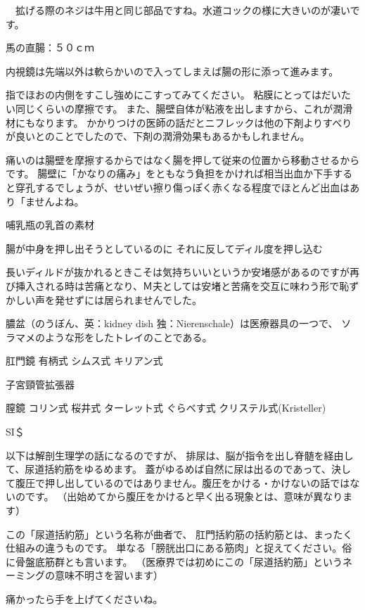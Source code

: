 　拡げる際のネジは牛用と同じ部品ですね。水道コックの様に大きいのが凄いです。

馬の直腸：５０ｃｍ


内視鏡は先端以外は軟らかいので入ってしまえば腸の形に添って進みます。

指でほおの内側をすこし強めにこすってみてください。
粘膜にとってはだいたい同じくらいの摩擦です。
また、腸壁自体が粘液を出しますから、これが潤滑材にもなります。
かかりつけの医師の話だとニフレックは他の下剤よりすべりが良いとのことでしたので、下剤の潤滑効果もあるかもしれません。

痛いのは腸壁を摩擦するからではなく腸を押して従来の位置から移動させるからです。
腸壁に「かなりの痛み」をともなう負担をかければ相当出血か下手すると穿孔するでしょうが、せいぜい擦り傷っぽく赤くなる程度でほとんど出血はあり「ませんよね。


哺乳瓶の乳首の素材


腸が中身を押し出そうとしているのに
それに反してディル度を押し込む

長いディルドが抜かれるときこそは気持ちいいというか安堵感があるのですが再び挿入される時は苦痛となり、Ｍ夫としては安堵と苦痛を交互に味わう形で恥ずかしい声を発せずには居られませんでした。

膿盆（のうぼん、英：kidney dish 独：Nierenschale）は医療器具の一つで、
ソラマメのような形をしたトレイのことである。

肛門鏡
有柄式
シムス式
キリアン式

子宮頸管拡張器

膣鏡
コリン式
桜井式
ターレット式
ぐらべす式
クリステル式(Kristeller)

SI＄

以下は解剖生理学の話になるのですが、
排尿は、脳が指令を出し脊髄を経由して、尿道括約筋をゆるめます。
蓋がゆるめば自然に尿は出るのであって、決して腹圧で押し出しているのではありません。腹圧をかける・かけないの話ではないのです。
（出始めてから腹圧をかけると早く出る現象とは、意味が異なります）

この「尿道括約筋」という名称が曲者で、
肛門括約筋の括約筋とは、まったく仕組みの違うものです。
単なる「膀胱出口にある筋肉」と捉えてください。俗に骨盤底筋群とも言います。
（医療界では初めにこの「尿道括約筋」というネーミングの意味不明さを習います）





痛かったら手を上げてくださいね。









